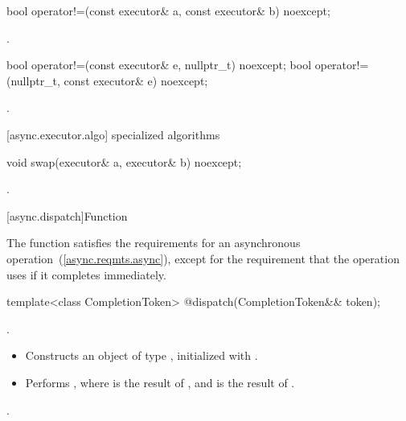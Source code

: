 %
\begin{itemdecl}
bool operator!=(const executor& a, const executor& b) noexcept;
\end{itemdecl}

\begin{itemdescr}
\pnum
\returns {}.
\end{itemdescr}

%
\begin{itemdecl}
bool operator!=(const executor& e, nullptr_t) noexcept;
bool operator!=(nullptr_t, const executor& e) noexcept;
\end{itemdecl}

\begin{itemdescr}
\pnum
\returns {}.
\end{itemdescr}



[async.executor.algo]{ specialized algorithms}

%
\begin{itemdecl}
void swap(executor& a, executor& b) noexcept;
\end{itemdecl}

\begin{itemdescr}
\pnum
\effects {}.
\end{itemdescr}




[async.dispatch]{Function }

%
\pnum
\begin{note} The function  satisfies the requirements for an asynchronous operation~(\ref{async.reqmts.async}), except for the requirement that the operation uses  if it completes immediately. \end{note}

\begin{itemdecl}
template<class CompletionToken>
  @\DEDUCED@ dispatch(CompletionToken&& token);
\end{itemdecl}

\begin{itemdescr}
\pnum
\completionsig {}.

\pnum
\effects
\begin{itemize}
\item
 Constructs an object  of type , initialized with .
\item
 Performs , where  is the result of , and  is the result of .
\end{itemize}

\pnum
\returns {}.
\end{itemdescr}

